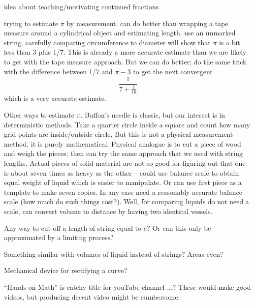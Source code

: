 idea about teaching/motivating continued fractions

trying to estimate $\pi$ by measurement. can do better than wrapping a tape
measure around a cylindrical object and estimating length. use an unmarked
string. carefully comparing circumference to diameter will show that $\pi$ is a bit less than 3 plus 1/7. This is already a more accurate estimate than we are
likely to get with the tape measure approach. But we can do better; do the same trick with the difference between 1/7 and $\pi - 3$ to get the next convergent
\[
\frac{1}{7 + \frac{1}{16}}
\]
which is a very accurate estimate.

Other ways to estimate $\pi$. Buffon's needle is classic, but our interest is in deterministic methods. Take a quarter circle inside a square and count how many grid points
are inside/outside circle. But this is not a physical measurement method, it is purely
mathematical. Physical analogue is to cut a piece of wood and weigh the pieces; then can try the same approach that we used with string lengths. Actual pieces of solid material are not so good for figuring out that one is about seven times as heavy as the other -- could use balance scale to obtain equal weight of liquid which is easier to manipulate. Or can use first piece as a template to make seven copies. In any case need a reasonably accurate balance scale (how much do such things cost?). Well, for comparing liquids do not need a scale, can convert volume to distance by having two identical vessels.

Any way to cut off a length of string equal to $e$? Or can this only be approximated by a limiting process?

Something similar with volumes of liquid instead of strings? Areas even?

Mechanical device for rectifying a curve?

``Hands on Math'' is catchy title for youTube channel ...? These would make good videos, but producing decent video might be cumbersome.
